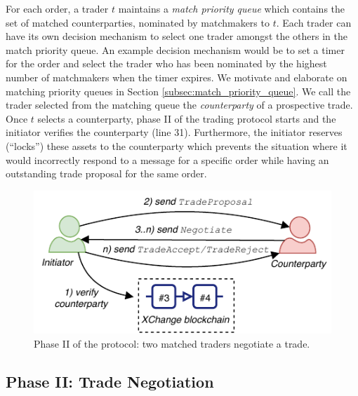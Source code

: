 For each order, a trader $ t $ maintains a \emph{match priority queue} which contains the set of matched counterparties, nominated by matchmakers to $ t $. 
Each trader can have its own decision mechanism to select one trader amongst the others in the match priority queue.
An example decision mechanism would be to set a timer for the order and select the trader who has been nominated by the highest number of matchmakers when the timer expires. 
We motivate and elaborate on matching priority queues in Section \ref{subsec:match_priority_queue}.
We call the trader selected from the matching queue the \textit{counterparty} of a prospective trade.
Once $ t $ selects a counterparty, phase II of the \ModelName{} trading protocol starts and the initiator verifies the counterparty (line 31). 
Furthermore, the initiator reserves (\enquote{locks}) these assets to the counterparty which prevents the situation where it would incorrectly respond to a \MsgTrdProp{} message for a specific order while having an outstanding trade proposal for the same order.

\begin{figure}[h]
	\centering
	\includegraphics[width=0.6\linewidth]{xchange/assets/xchange_protocol_2}
	\caption{Phase II of the \ModelName{} protocol: two matched traders negotiate a trade.}
	\label{fig:matching_protocol_2}
\end{figure}

\subsection{Phase II: Trade Negotiation}
\label{sec:phase_negotiation}

